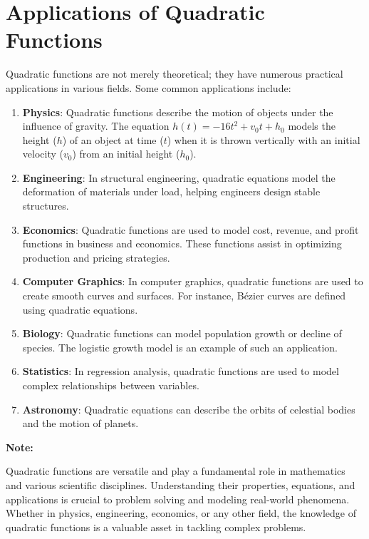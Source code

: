 \documentclass[12pt,a4paper]{article}
\newenvironment{note}
  {\begin{framed}\colorbox{noteboxcolor}{
  \parbox{\dimexpr\linewidth-2\fboxsep}{
  \textbf{Note:}}}}
  {\end{framed}}
\begin{document}
\newpage
\section{Applications of Quadratic Functions}

Quadratic functions are not merely theoretical; they have numerous practical applications in various fields. Some common applications include:

\begin{enumerate}
    \item \textbf{Physics}: Quadratic functions describe the motion of objects under the influence of gravity. The equation $h(t) = -16t^2 + v_0t + h_0$ models the height ($h$) of an object at time ($t$) when it is thrown vertically with an initial velocity ($v_0$) from an initial height ($h_0$).

    \item \textbf{Engineering}: In structural engineering, quadratic equations model the deformation of materials under load, helping engineers design stable structures.

    \item \textbf{Economics}: Quadratic functions are used to model cost, revenue, and profit functions in business and economics. These functions assist in optimizing production and pricing strategies.

    \item \textbf{Computer Graphics}: In computer graphics, quadratic functions are used to create smooth curves and surfaces. For instance, Bézier curves are defined using quadratic equations.

    \item \textbf{Biology}: Quadratic functions can model population growth or decline of species. The logistic growth model is an example of such an application.

    \item \textbf{Statistics}: In regression analysis, quadratic functions are used to model complex relationships between variables.

    \item \textbf{Astronomy}: Quadratic equations can describe the orbits of celestial bodies and the motion of planets.

\end{enumerate}
\begin{note}
Quadratic functions are versatile and play a fundamental role in mathematics and various scientific disciplines. Understanding their properties, equations, and applications is crucial to problem solving and modeling real-world phenomena. Whether in physics, engineering, economics, or any other field, the knowledge of quadratic functions is a valuable asset in tackling complex problems.
\end{note}
\end{document}
